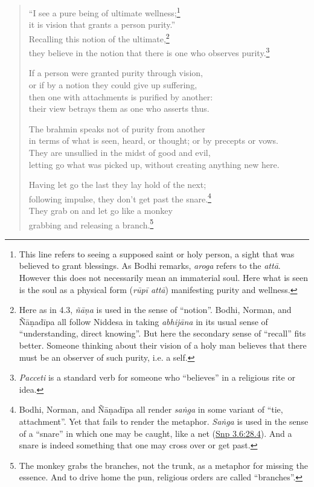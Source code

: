 \documentclass[12pt,openany]{book}%
\begin{document}
\begin{verse}%
“I see a pure being of ultimate wellness;\footnote{This line refers to seeing a supposed saint or holy person, a sight that was believed to grant blessings. As Bodhi remarks, \textit{aroga} refers to the \textit{\textsanskrit{attā}}. However this does not necessarily mean an immaterial soul. Here what is seen is the soul as a physical form (\textit{\textsanskrit{rūpī} \textsanskrit{attā}}) manifesting purity and wellness. } \\
it is vision that grants a person purity.” \\
Recalling this notion of the ultimate,\footnote{Here as in 4.3, \textit{\textsanskrit{ñāṇa}} is used in the sense of “notion”. Bodhi, Norman, and \textsanskrit{Ñāṇadīpa} all follow Niddesa in taking \textit{\textsanskrit{abhijāna}} in its usual sense of “understanding, direct knowing”. But here the secondary sense of “recall” fits better. Someone thinking about their vision of a holy man believes that there must be an observer of such purity, i.e. a self. } \\
they believe in the notion that there is one who observes purity.\footnote{\textit{Pacceti} is a standard verb for someone who “believes” in a religious rite or idea. } 

If a person were granted purity through vision, \\
or if by a notion they could give up suffering, \\
then one with attachments is purified by another: \\
their view betrays them as one who asserts thus. 

The brahmin speaks not of purity from another \\
in terms of what is seen, heard, or thought; or by precepts or vows. \\
They are unsullied in the midst of good and evil, \\
letting go what was picked up, without creating anything new here. 

Having let go the last they lay hold of the next; \\
following impulse, they don’t get past the snare.\footnote{Bodhi, Norman, and \textsanskrit{Ñāṇadīpa} all render \textit{\textsanskrit{saṅga}} in some variant of “tie, attachment”. Yet that fails to render the metaphor. \textit{\textsanskrit{Saṅga}} is used in the sense of a “snare” in which one may be caught, like a net (\href{https://suttacentral.net/snp3.6/en/sujato\#28.4}{Snp 3.6:28.4}). And a snare is indeed something that one may cross over or get past. } \\
They grab on and let go like a monkey \\
grabbing and releasing a branch.\footnote{The monkey grabs the branches, not the trunk, as a metaphor for missing the essence. And to drive home the pun, religious orders are called “branches”. } 


\end{verse}
\end{document}

